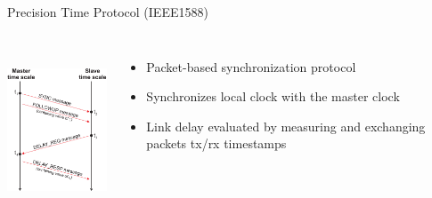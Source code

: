 \documentclass[compress,red]{beamer}
\begin{document}
\begin{frame}{Precision Time Protocol (IEEE1588)}

\begin{columns}[c]
  \column{1.5in}
      \begin{center}
	\includegraphics[height=5cm]{../../figures/protocol/ptp_exchange.pdf}
      \end{center}
  \column{2.5in}
      \begin{itemize}
	  \item Packet-based synchronization protocol
	  \item Synchronizes local clock with the master clock
	  \item Link delay evaluated by measuring and exchanging packets tx/rx timestamps
      \end{itemize}
  \end{columns}
\end{frame}
\end{document}
